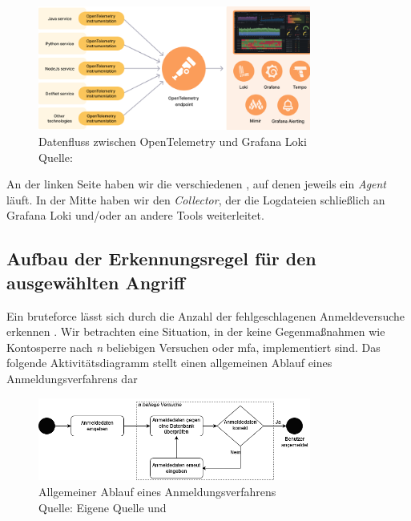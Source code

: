 \begin{figure}[H]
   \centering
   \includegraphics[width=0.8\textwidth]{assets/Grafana_OpenTelemtry.png}
   \caption{Datenfluss zwischen OpenTelemetry und Grafana Loki\\Quelle: \citep{Grafana_WhatOpentelemetry}}
   \centering
\end{figure}

An der linken Seite haben wir die verschiedenen , auf denen jeweils ein \textit{Agent} läuft. In der Mitte haben wir den \textit{Collector}, der die Logdateien schließlich an Grafana Loki und/oder an andere Tools weiterleitet.

\newpage
\subsection{Aufbau der Erkennungsregel für den ausgewählten Angriff}
Ein \gls{bruteforce} lässt sich durch die Anzahl der fehlgeschlagenen Anmeldeversuche erkennen \citep{Selvaganesh_SplunkBruteForce}. Wir betrachten eine Situation, in der keine Gegenmaßnahmen wie Kontosperre nach \textit{n} beliebigen Versuchen oder \gls{mfa}, implementiert sind. Das folgende Aktivitätsdiagramm stellt einen allgemeinen Ablauf eines Anmeldungsverfahrens dar

\begin{figure}[H]
   \centering
   \includegraphics[width=0.8\textwidth]{assets/Anmeldeverfahren.drawio.png}
   \caption{Allgemeiner Ablauf eines Anmeldungsverfahrens \\Quelle: Eigene Quelle und \citep{Selvaganesh_SplunkBruteForce}}
   \centering
\end{figure}

